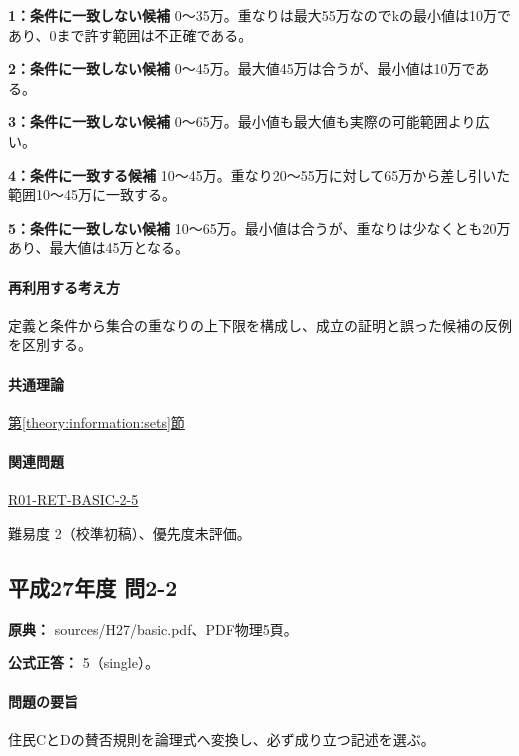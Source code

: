 \noindent\textbf{1：条件に一致しない候補} 0〜35万。重なりは最大55万なのでkの最小値は10万であり、0まで許す範囲は不正確である。\par

\noindent\textbf{2：条件に一致しない候補} 0〜45万。最大値45万は合うが、最小値は10万である。\par

\noindent\textbf{3：条件に一致しない候補} 0〜65万。最小値も最大値も実際の可能範囲より広い。\par

\noindent\textbf{4：条件に一致する候補} 10〜45万。重なり20〜55万に対して65万から差し引いた範囲10〜45万に一致する。\par

\noindent\textbf{5：条件に一致しない候補} 10〜65万。最小値は合うが、重なりは少なくとも20万あり、最大値は45万となる。\par

\paragraph{再利用する考え方} 定義と条件から集合の重なりの上下限を構成し、成立の証明と誤った候補の反例を区別する。

\paragraph{共通理論} \hyperref[theory:information:sets]{第\ref*{theory:information:sets}節}

\paragraph{関連問題} \hyperref[q:r01-ret-basic-2-5]{R01-RET-BASIC-2-5}

\par 難易度 2（校準初稿）、優先度未評価。

\subsection{平成27年度 問2-2}
\label{q:h27-reg-basic-2-2}

\noindent\textbf{原典：} sources/H27/basic.pdf、PDF物理5頁。

\textbf{公式正答：} 5（single）。

\paragraph{問題の要旨} 住民CとDの賛否規則を論理式へ変換し、必ず成り立つ記述を選ぶ。

